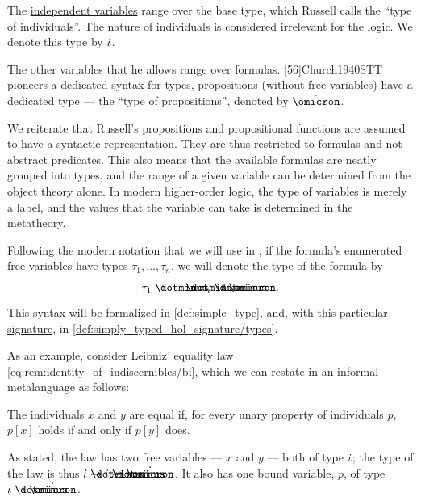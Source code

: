 \begin{concept}
\begin{thmenum}
    The \hyperref[con:variable_dependence]{independent variables} range over the base type, which Russell calls the \enquote{type of individuals}. The nature of individuals is considered irrelevant for the logic. We denote this type by \( \dot{\iota} \).

    The other variables that he allows range over formulas. [56]{Church1940STT} pioneers a dedicated syntax for types, propositions (without free variables) have a dedicated type --- the \enquote{type of propositions}, denoted by \( \syn\omicron \).

    We reiterate that Russell's propositions and propositional functions are assumed to have a syntactic representation. They are thus restricted to formulas and not abstract predicates. This also means that the available formulas are neatly grouped into types, and the range of a given variable can be determined from the object theory alone. In modern higher-order logic, the type of variables is merely a label, and the values that the variable can take is determined in the metatheory.

    Following the modern notation that we will use in , if the formula's enumerated free variables have types \( \tau_1, \ldots, \tau_n \), we will denote the type of the formula by
    \begin{equation*}
      \tau_1 \synimplies \cdots \synimplies \tau_n \synimplies \syn\omicron.
    \end{equation*}

    This syntax will be formalized in \cref{def:simple_type}, and, with this particular \hyperref[def:simple_type_signature]{signature}, in \cref{def:simply_typed_hol_signature/types}.

    As an example, consider Leibniz' equality law \eqref{eq:rem:identity_of_indiscernibles/bi}, which we can restate in an informal metalanguage as follows:
    \begin{displayquote}
      The individuals \( x \) and \( y \) are equal if, for every unary property of individuals \( p \), \( p[x] \) holds if and only if \( p[y] \) does.
    \end{displayquote}

    As stated, the law has two free variables --- \( x \) and \( y \) --- both of type \( \dot{\iota} \); the type of the law is thus \( \syn\iota \synimplies \syn\iota \synimplies \syn\omicron \). It also has one bound variable, \( p \), of type \( \syn\iota \synimplies \syn\omicron \).


\end{thmenum}
\end{concept}
